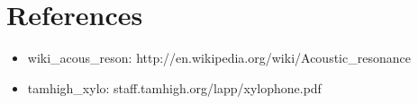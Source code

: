 \documentclass[12pt]{article}
\begin{document}
\newpage
\section{References}
\begin{itemize}
\item wiki\_acous\_reson: http://en.wikipedia.org/wiki/Acoustic\_resonance
\item tamhigh\_xylo: staff.tamhigh.org/lapp/xylophone.pdf
\end{itemize}
\end{document}
